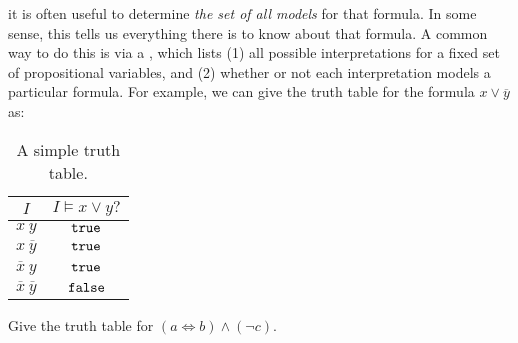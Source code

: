 \documentclass{tufte-handout}
\begin{document}
 it is often useful to determine \emph{the 
set of all models} for that formula. In some sense, this tells us everything 
there is to know about that formula. A common way to do this is via a 
, which lists (1) all possible interpretations for a fixed 
set of propositional variables, and (2) whether or not each interpretation 
models a particular formula. For example, we can give the truth table 
for the formula $x \lor \overline{y}$ as:


\begin{table}
\centering
 \begin{tabular}{c||c}
    \toprule
    $I$ & $ I \models x \lor y?$ \\
    \midrule 
    $x~y$ & $\texttt{true}$ \\ 
    $x ~ \overline{y}$ & $\texttt{true}$ \\ 
    $\overline{x}~y $ & $\texttt{true}$ \\ 
    $\overline{x} ~ \overline{y}$ & $\texttt{false}$ \\ 
    \bottomrule
\end{tabular}
\caption{A simple truth table.}
\end{table}

\begin{exercise}[$\star$]
Give the truth table for $(a \Leftrightarrow b) \land (\neg c).$ 
\end{exercise}





\end{document}
